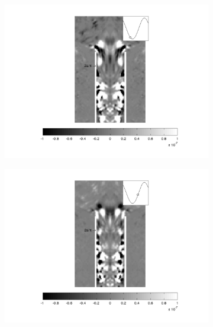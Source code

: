 \begin{landscape}
\begin{figure}[ht!]
\begin{subfigure}{0.55 \textwidth}
  \includegraphics[width=1.\linewidth]{figuras/max_ka_01_3.png}
  \caption[]{}
  \label{fig:max_01_3}
\end{subfigure}
\par\medskip
\begin{subfigure}{0.55 \textwidth}
  \includegraphics[width=1.\linewidth]{figuras/max_ka_01_4.png}
  \caption[]{}
  \label{fig:max_01_4}
\end{subfigure}
\begin{subfigure}{0.55 \textwidth}

\end{subfigure}
\end{figure}
\end{landscape}
